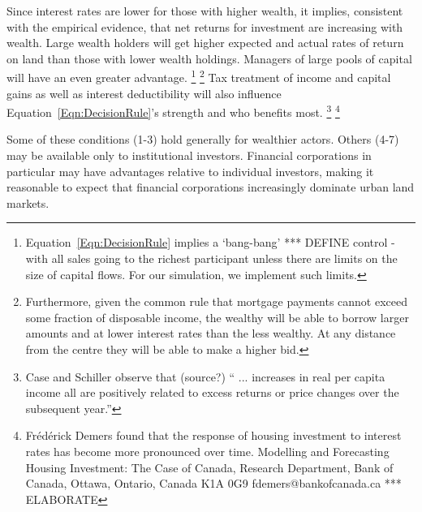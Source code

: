 Since interest rates are lower for those with higher wealth, it implies, consistent with the empirical evidence, that net returns for investment are increasing with wealth. Large wealth holders will get higher expected and actual rates of return on land than those with lower wealth holdings. Managers of large pools of capital will have an even greater advantage. \footnote{ Equation~\ref{Eqn:DecisionRule} implies a `bang-bang' *** DEFINE control - with all sales going to the richest participant unless there are limits on the size of capital flows. For our simulation, we implement such limits. } \footnote{Furthermore, given the  common rule that mortgage payments cannot exceed some fraction of disposable income, the wealthy will be able to borrow larger amounts and at lower interest rates than the less wealthy. At any distance from the centre they will be able to make a higher bid.} %
Tax treatment of income and capital gains as well as interest deductibility will also influence Equation~\ref{Eqn:DecisionRule}'s strength and who benefits most. \footnote{Case and Schiller observe that (source?) 
`` ... increases in real per capita income all are positively related to excess returns or price changes over the subsequent year.''} 
\footnote{Fr\'ed\'erick Demers found that the response of housing investment to interest rates has become more pronounced over time. Modelling and Forecasting Housing Investment: The Case of Canada,  Research Department, Bank of Canada, Ottawa, Ontario, Canada K1A 0G9 fdemers@bankofcanada.ca *** ELABORATE} 

Some  of these conditions (1-3) hold generally for wealthier actors. Others (4-7) may be available only to institutional investors.  Financial corporations in particular may have advantages relative to individual investors, making it  reasonable to expect that financial corporations increasingly dominate urban land markets. %

